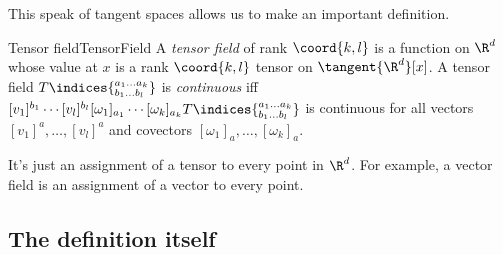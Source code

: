 This speak of tangent spaces allows us to make an important definition.
\begin{dfn}{Tensor field}{TensorField}
A \emph{tensor field} of rank $\coord{k,l}$ is a function on $\R ^d$ whose value at $x$ is a rank $\coord{k,l}$ tensor on $\tangent{\R ^d}[x]$.  A tensor field $T\indices{^{a_1\ldots a_k}_{b_1\ldots b_l}}$ is \emph{continuous} iff $[v_1]^{b_1}\cdots [v_l]^{b_l}[\omega _1]_{a_1}\cdots [\omega _k]_{a_k}T\indices{^{a_1\ldots a_k}_{b_1\ldots b_l}}$ is continuous for all vectors $[v_1]^a,\ldots ,[v_l]^a$ and covectors $[\omega _1]_a,\ldots ,[\omega _k]_a$.
\begin{rmk}
It's just an assignment of a tensor to every point in $\R ^d$.  For example, a vector field is an assignment of a vector to every point.
\end{rmk}
\end{dfn}

\subsection{The definition itself}

